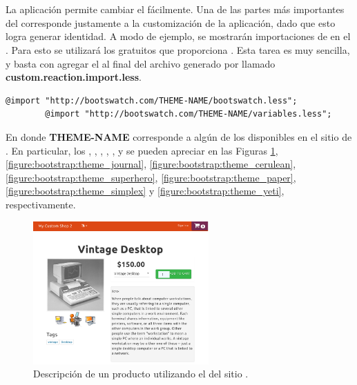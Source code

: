 \section{\themesCPT}

	La aplicación permite cambiar el \themeCPT fácilmente.
	Una de las partes más importantes del \frameworkPC \ecommerceCOM corresponde justamente a la customización de la aplicación, dado que esto logra generar identidad. A modo de ejemplo, se mostrarán importaciones de \themesCPT en el \frameworkPC. Para esto se utilizará los \themesCPT gratuitos que proporciona \bootswatchNAME. Esta tarea es muy sencilla, y basta con agregar el  al final del archivo generado por \bootstrapPackage llamado \textbf{custom.reaction.import.less}.

	\medskip
	\begin{lstlisting}[caption= Código genérico para importar \themesCPT desde \bootswatchNAME., label=source:less:generic_bootswatch_theme]
		@import "http://bootswatch.com/THEME-NAME/bootswatch.less";
		@import "http://bootswatch.com/THEME-NAME/variables.less";
	\end{lstlisting}

	En donde \textbf{THEME-NAME} corresponde a algún \themeCPT de los disponibles en el sitio de \bootswatchNAME. En particular, los \themesCPT \textbf{\themeUnited}, \textbf{\themeJournal}, \textbf{\themeCerulean}, \textbf{\themeSuperHero}, \textbf{\themePaper}, \textbf{\themeSimplex} y \textbf{\themeYeti} se pueden apreciar en las Figuras \ref{figure:bootstrap:theme_united}, \ref{figure:bootstrap:theme_journal}, \ref{figure:bootstrap:theme_cerulean}, \ref{figure:bootstrap:theme_superhero}, \ref{figure:bootstrap:theme_paper}, \ref{figure:bootstrap:theme_simplex} y \ref{figure:bootstrap:theme_yeti}, respectivamente.


	\begin{figure}[H]
		\centering
		\includegraphics[width=0.6\textwidth]{figuras/bootstrap/bootstrap_theme_united.png}

		\caption{Descripción de un producto utilizando el \themeCPT \textbf{\themeUnited} del sitio \bootswatchNAME.}
		\label{figure:bootstrap:theme_united}
	\end{figure}

